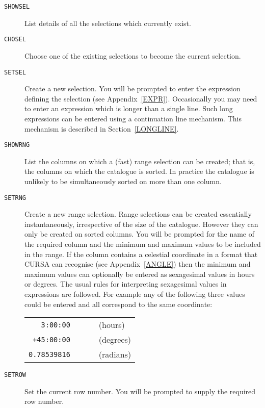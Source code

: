 \documentclass[twoside,11pt]{article}
\renewcommand{\_}{\texttt{\symbol{95}}}
\begin{document}
\begin{description}
  \item[ {\tt SHOWSEL} ] List details of all the selections which
   currently exist.

  \item[ {\tt CHOSEL} ] Choose one of the existing selections to become
   the current selection.

  \item[ {\tt SETSEL} ] Create a new selection.  You will be prompted to
   enter the expression defining the selection (see Appendix~\ref{EXPR}).
   Occasionally you may need to enter an expression which is longer than a
   single line.  Such long expressions can be entered using a continuation
   line mechanism.  This mechanism is described in Section~\ref{LONGLINE}.

  \item[ {\tt SHOWRNG} ] List the columns on which a (fast) range
   selection can be created; that is, the columns on which the
   catalogue is sorted. In practice the catalogue is unlikely to be
   simultaneously sorted on more than one column.

  \item[ {\tt SETRNG} ] Create a new range selection.  Range selections
   can be created essentially instantaneously, irrespective of the
   size of the catalogue.  However they can only be created on sorted
   columns.  You will be prompted for the name of the required column
   and the minimum and maximum values to be included in the range. If
   the column contains a celestial coordinate in a format that CURSA
   can recognise (see Appendix~\ref{ANGLE}) then the minimum and
   maximum values can optionally be entered as sexagesimal values in
   hours or degrees.  The usual rules for interpreting sexagesimal
   values in expressions are followed.  For example any of the following
   three values could be entered and all correspond to the same
   coordinate:

  \begin{center}
  \begin{tabular}{rll}
   {\tt 3:00:00}    & ~~~ & (hours)   \\
   {\tt +45:00:00}  & ~~~ & (degrees) \\
   {\tt 0.78539816} & ~~~ & (radians) \\
  \end{tabular}
  \end{center}

  \item[ {\tt SETROW} ] Set the current row number. You will be prompted
   to supply the required row number.


\end{description}
\end{document}

